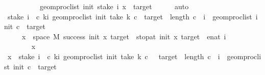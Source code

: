 \begin{isabellebody}
\ \ \ \ \ \ \ \ \ \ {\isacartoucheopen}geom{\isacharunderscore}{\kern0pt}proc{\isacharunderscore}{\kern0pt}list\ init\ {\isacharparenleft}{\kern0pt}stake\ i\ x{\isacharparenright}{\kern0pt}\ {\isacharequal}{\kern0pt}\ target{\isacartoucheclose}\isanewline
\ \ \ \ \isamarkupfalse%
\ auto\isanewline
{}\isamarkupfalse%
\isanewline
\ \ \isamarkupfalse%
\isanewline
\ \ \ \ \isamarkupfalse%
\ {\isachardoublequoteopen}stake\ i\ {\isacharminus}{\kern0pt}{\isacharbackquote}{\kern0pt}\ {\isacharbraceleft}{\kern0pt}c{\isachardot}{\kern0pt}\ {\isacharparenleft}{\kern0pt}{\isasymforall}k{\isacharless}{\kern0pt}i{\isachardot}{\kern0pt}\ geom{\isacharunderscore}{\kern0pt}proc{\isacharunderscore}{\kern0pt}list\ {\isacharparenleft}{\kern0pt}init{\isacharparenright}{\kern0pt}\ {\isacharparenleft}{\kern0pt}take\ k\ c{\isacharparenright}{\kern0pt}\ {\isasymnotin}\ {\isacharbraceleft}{\kern0pt}{}{\isacharcomma}{\kern0pt}target{\isacharbraceright}{\kern0pt}{\isacharparenright}{\kern0pt}\ {\isasymand}\ length\ c\ {\isacharequal}{\kern0pt}\ i\ {\isasymand}\ geom{\isacharunderscore}{\kern0pt}proc{\isacharunderscore}{\kern0pt}list\ {\isacharparenleft}{\kern0pt}init{\isacharparenright}{\kern0pt}\ c\ {\isacharequal}{\kern0pt}\ target{\isacharbraceright}{\kern0pt}\isanewline
\ \ \ \ {\isasymsubseteq}\ {\isacharbraceleft}{\kern0pt}x\ {\isasymin}\ space\ M{\isachardot}{\kern0pt}\ success\ {\isacharparenleft}{\kern0pt}init{\isacharparenright}{\kern0pt}\ x\ {\isacharparenleft}{\kern0pt}target{\isacharparenright}{\kern0pt}\ {\isasymand}\ stop{\isacharunderscore}{\kern0pt}at\ {\isacharparenleft}{\kern0pt}init{\isacharparenright}{\kern0pt}\ x\ {\isacharparenleft}{\kern0pt}target{\isacharparenright}{\kern0pt}\ {\isacharequal}{\kern0pt}\ enat\ i{\isacharbraceright}{\kern0pt}{\isachardoublequoteclose}\isanewline
\ \ \ \ \isamarkupfalse%
\ \isanewline
\ \ \ \ \ \ \isamarkupfalse%
\ x\ \isanewline
\ \ \ \ \ \ \isamarkupfalse%
\ {\isachardoublequoteopen}x\ {\isasymin}\ stake\ i\ {\isacharminus}{\kern0pt}{\isacharbackquote}{\kern0pt}\ {\isacharbraceleft}{\kern0pt}c{\isachardot}{\kern0pt}\ {\isacharparenleft}{\kern0pt}{\isasymforall}k{\isacharless}{\kern0pt}i{\isachardot}{\kern0pt}\ geom{\isacharunderscore}{\kern0pt}proc{\isacharunderscore}{\kern0pt}list\ {\isacharparenleft}{\kern0pt}init{\isacharparenright}{\kern0pt}\ {\isacharparenleft}{\kern0pt}take\ k\ c{\isacharparenright}{\kern0pt}\ {\isasymnotin}\ {\isacharbraceleft}{\kern0pt}{}{\isacharcomma}{\kern0pt}\ target{\isacharbraceright}{\kern0pt}{\isacharparenright}{\kern0pt}\ {\isasymand}\ length\ c\ {\isacharequal}{\kern0pt}\ i\ {\isasymand}\ geom{\isacharunderscore}{\kern0pt}proc{\isacharunderscore}{\kern0pt}list\ {\isacharparenleft}{\kern0pt}init{\isacharparenright}{\kern0pt}\ c\ {\isacharequal}{\kern0pt}\ target{\isacharbraceright}{\kern0pt}{\isachardoublequoteclose}\isanewline

\end{isabellebody}
